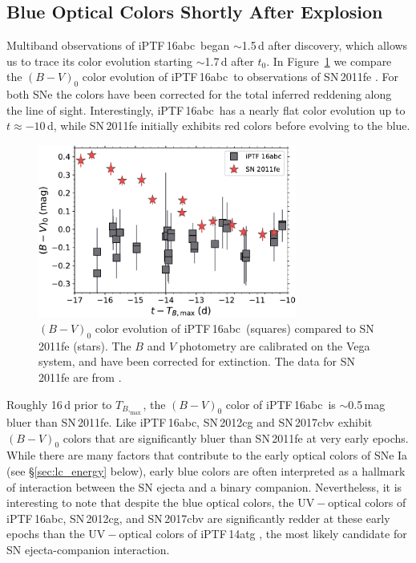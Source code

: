 \documentclass[twocolumn]{aastex61}
\newcommand{\abc}{iPTF\,16abc}
\begin{document}
\subsection{Blue Optical Colors Shortly After Explosion}

Multiband observations of \abc\ began $\sim$1.5\,d after discovery, which
allows us to trace its color evolution starting $\sim$1.7\,d after $t_0$. In
Figure~\ref{fig:B-Vcolors} we compare the $(B - V)_0$ color evolution of \abc\
to observations of SN\,2011fe \citep{2016ApJ...820...67Z}. For both SNe the
colors have been corrected for the total inferred reddening along the line of
sight. Interestingly, \abc\ has a nearly flat color evolution up to $t \approx
-10$\,d, while SN\,2011fe initially exhibits red colors before evolving to the
blue.

\begin{figure}[]
  \centering
  \includegraphics[width=3.35in]{16abc_11fe_colors.pdf}
  \caption{$(B - V)_0$ color evolution of \abc\ (squares) 
    compared to SN\,2011fe (stars). The $B$ and $V$ photometry are calibrated
    on the Vega system, and have been corrected for extinction. The data for
    SN\,2011fe are from \citet{2016ApJ...820...67Z}.}
  \label{fig:B-Vcolors}
\end{figure}

Roughly 16\,d prior to $T_{B,_\mathrm{max}}$, the $(B - V)_0$ color of \abc\ is
$\sim$0.5\,mag bluer than SN\,2011fe. Like \abc, SN\,2012cg
\citep{2016ApJ...820...92M} and SN\,2017cbv \citep{2017ApJ...845L..11H}
exhibit $(B - V)_0$ colors that are significantly bluer than SN\,2011fe at
very early epochs. While there are many factors that contribute to the early
optical colors of SNe Ia (see \S\ref{sec:lc_energy} below), early blue colors
are often interpreted as a hallmark of interaction between the SN ejecta and a
binary companion. Nevertheless, it is interesting to note that despite the
blue optical colors, the $\mathrm{UV} - \mathrm{optical}$ colors of \abc,
SN\,2012cg, and SN\,2017cbv are significantly redder at these early epochs
than the $\mathrm{UV} - \mathrm{optical}$ colors of iPTF\,14atg
\citep{2015Natur.521..328C}, the most likely candidate for SN ejecta-companion
interaction.
\end{document}
